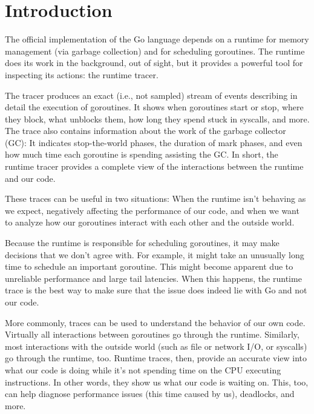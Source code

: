 \documentclass[10pt,letterpaper,oneside,openany,showtrims,draft]{memoir}
\begin{document}
\frontmatter

\mainmatter

\tableofcontents
{}

\chapter{Introduction}

The official implementation of the Go language depends on a runtime for memory management (via garbage collection) and for scheduling goroutines.
The runtime does its work in the background, out of sight, but it provides a powerful tool for inspecting its actions: the runtime tracer.

The tracer produces an exact (i.e., not sampled) stream of events describing in detail the execution of goroutines.
It shows when goroutines start or stop, where they block, what unblocks them, how long they spend stuck in syscalls, and more.
The trace also contains information about the work of the garbage collector (GC):
It indicates stop-the-world phases, the duration of mark phases, and even how much time each goroutine is spending assisting the GC.
In short, the runtime tracer provides a complete view of the interactions between the runtime and our code.

These traces can be useful in two situations:
When the runtime isn't behaving as we expect, negatively affecting the performance of our code,
and when we want to analyze how our goroutines interact with each other and the outside world.

Because the runtime is responsible for scheduling goroutines, it may make decisions that we don't agree with.
For example, it might take an unusually long time to schedule an important goroutine.
This might become apparent due to unreliable performance and large tail latencies.
When this happens, the runtime trace is the best way to make sure that the issue does indeed lie with Go and not our code.

More commonly, traces can be used to understand the behavior of our own code.
Virtually all interactions between goroutines go through the runtime.
Similarly, most interactions with the outside world (such as file or network I/O, or syscalls) go through the runtime, too.
Runtime traces, then, provide an accurate view into what our code is doing while it's not spending time on the CPU executing instructions.
In other words, they show us what our code is waiting on.
This, too, can help diagnose performance issues (this time caused by us), deadlocks, and more.
\end{document}
